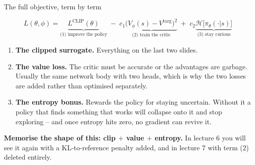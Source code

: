 \documentclass[aspectratio=169]{beamer}
\begin{document}
\begin{frame}{The full objective, term by term}
  \begin{center}
  \begin{tcolorbox}[colback=lightbg, colframe=popblue, boxrule=0.8pt, arc=2pt, width=0.96\textwidth]
    \[ L(\theta,\phi) = \underbrace{L^{\text{CLIP}}(\theta)}_{\text{(1) improve the policy}}
       \;-\; c_1 \underbrace{\big(V_\phi(s) - V^{\text{targ}}\big)^2}_{\text{(2) train the critic}}
       \;+\; c_2 \underbrace{\mathcal{H}\big[\pi_\theta(\cdot|s)\big]}_{\text{(3) stay curious}} \]
  \end{tcolorbox}
  \end{center}

  \vskip 6pt
  \footnotesize
  \begin{enumerate}\itemsep4pt
    \item \textbf{The clipped surrogate.} Everything on the last two slides.
    \item \textbf{The value loss.} The critic must be accurate or the advantages are garbage.
          Usually the same network body with two heads, which is why the two losses are added
          rather than optimised separately.
    \item \textbf{The entropy bonus.} Rewards the policy for staying uncertain. Without it a
          policy that finds something that works will collapse onto it and stop exploring --
          and once entropy hits zero, no gradient can revive it.
  \end{enumerate}

  \vskip 6pt
  \begin{tcolorbox}[colback=paramgreen!8, colframe=paramgreen, boxrule=0.6pt, arc=2pt]
    \footnotesize
    \textbf{Memorise the shape of this: clip $+$ value $+$ entropy.} In lecture 6 you will see
    it again with a KL-to-reference penalty added, and in lecture 7 with term (2) deleted
    entirely.
  \end{tcolorbox}
\end{frame}
\end{document}
